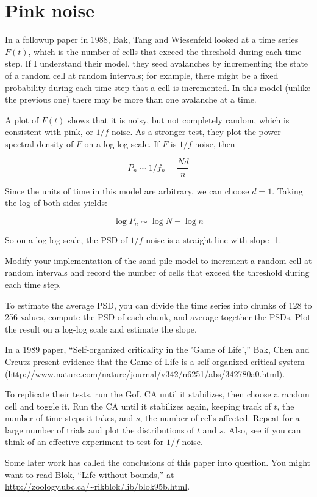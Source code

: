 \documentclass[10pt]{book}
\begin{document}
\section{Pink noise}

In a followup paper in 1988, Bak, Tang and Wiesenfeld looked
at a time series $F(t)$, which is the number of cells that
exceed the threshold during each time step.  If I understand
their model, they seed avalanches by incrementing the state
of a random cell at random intervals; for example, there might
be a fixed probability during each time step that a cell
is incremented.  In this model (unlike the previous one) there
may be more than one avalanche at a time.

A plot of $F(t)$ shows that it is noisy, but not completely
random, which is consistent with pink, or $1/f$ noise.
As a stronger test, they plot the power spectral density of
$F$ on a log-log scale.  If $F$ is $1/f$ noise, then

\[ P_n \sim 1 / f_n = \frac{N d}{n} \]

Since the units of time in this model are arbitrary, we
can choose $d=1$.  Taking the log of both sides yields:

\[ \log P_n \sim \log N - \log n \]

So on a log-log scale, the PSD of $1/f$ noise is a straight
line with slope -1.

\begin{exercise}

Modify your implementation of the sand pile model to increment
a random cell at random intervals and record the number of cells
that exceed the threshold during each time step.

To estimate the average PSD, you can divide the time series into
chunks of 128 to 256 values, compute the PSD of each chunk, and
average together the PSDs.  Plot the result on a log-log scale
and estimate the slope.

\end{exercise}


\begin{exercise}

In a 1989 paper, ``Self-organized criticality in the 'Game of Life',''
Bak, Chen and Creutz present evidence that the Game of Life is a
self-organized critical system
(\url{http://www.nature.com/nature/journal/v342/n6251/abs/342780a0.html}).
 

To replicate their tests, run the GoL CA until it stabilizes,
then choose a random cell and toggle it.  Run the CA until
it stabilizes again, keeping track of $t$, the number
of time steps it takes, and $s$, the number of cells affected.
Repeat for a large number of trials and plot the distributions
of $t$ and $s$.  Also, see if you can think of an effective
experiment to test for $1/f$ noise.

Some later work has called the conclusions of this paper into
question.  You might want to read Blok, ``Life without bounds,''
at \url{http://zoology.ubc.ca/~rikblok/lib/blok95b.html}.

\end{exercise}
\end{document}
